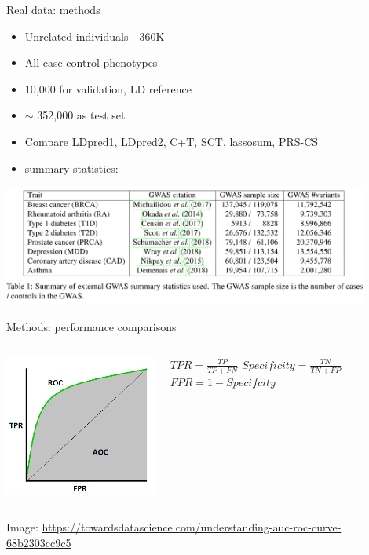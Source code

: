 \documentclass{beamer}
\begin{document}
 
  
    \begin{frame}[t]{Real data: methods}
       
          \begin{itemize}
                \item Unrelated individuals - 360K
                \item All case-control phenotypes
                \item 10,000 for validation, LD reference
                \item $\sim$ 352,000 as test set 
                \item Compare LDpred1, LDpred2, C+T, SCT, lassosum, PRS-CS
                \item summary statistics:
            \end{itemize}
                \includegraphics[width=120mm,scale=1.2]{table1.png}
    \end{frame}
    
      \begin{frame}[t]{Methods: performance comparisons}
         \begin{columns}[onlytextwidth]
                \includegraphics[width=60mm,scale=0.6]{auc.png}
                
                $TPR=\frac{TP}{TP+FN}$
                \newline
                \newline
                $Specificity=\frac{TN}{TN+FP}$
                \newline
                \newline
                $FPR=1-Specifcity$
                \end{columns}
                \vfill
                \tiny 
                Image: \url{https://towardsdatascience.com/understanding-auc-roc-curve-68b2303cc9c5}
     \end{frame}
 
\end{document}
